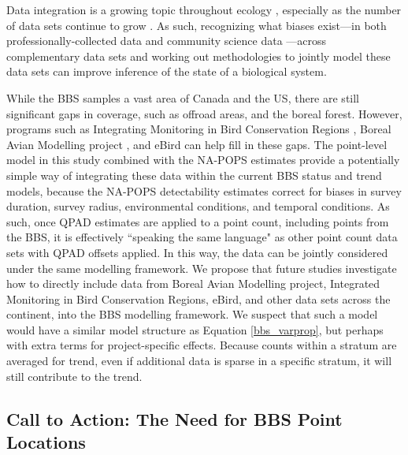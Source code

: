 \par Data integration is a growing topic throughout ecology \citep{isaac_data_2020, miller_recent_2019, pacifici_integrating_2017, boersch-supan_integrating_2021}, especially as the number of data sets continue to grow \citep{binley_minimizing_2023}.
As such, recognizing what biases exist---in both professionally-collected data and community science data \citep{binley_data_2023}---across complementary data sets and working out methodologies to jointly model these data sets can improve inference of the state of a biological system.

\par While the BBS samples a vast area of Canada and the US, there are still significant gaps in coverage, such as offroad areas, and the boreal forest. 
However, programs such as Integrating Monitoring in Bird Conservation Regions \citep{pavlacky_statistically_2017}, Boreal Avian Modelling project \citep{cumming_toward_2010}, and eBird \citep{sullivan_ebird_2014} can help fill in these gaps.
The point-level model in this study combined with the NA-POPS estimates provide a potentially simple way of integrating these data within the current BBS status and trend models, because the NA-POPS detectability estimates correct for biases in survey duration, survey radius, environmental conditions, and temporal conditions.
As such, once QPAD \citep{solymos_calibrating_2013} estimates are applied to a point count, including points from the BBS, it is effectively ``speaking the same language" as other point count data sets with QPAD offsets applied.
In this way, the data can be jointly considered under the same modelling framework.
We propose that future studies investigate how to directly include data from Boreal Avian Modelling project, Integrated Monitoring in Bird Conservation Regions, eBird, and other data sets across the continent, into the BBS modelling framework.
We suspect that such a model would have a similar model structure as Equation \ref{bbs_varprop}, but perhaps with extra terms for project-specific effects.
Because counts within a stratum are averaged for trend, even if additional data is sparse in a specific stratum, it will still contribute to the trend.


\subsection{Call to Action: The Need for BBS Point Locations}

